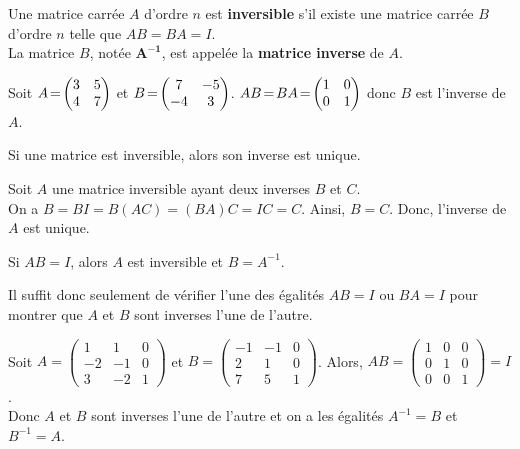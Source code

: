 \documentclass{cornouaille}
\begin{document}
\begin{definition}
Une matrice carrée $A$ d’ordre $n$ est \textbf{inversible} s’il existe une matrice carrée $B$ d’ordre $n$ telle que $AB=BA=I$.\\
La matrice $B$, notée $\boldsymbol{A^{-1}}$, est appelée la
\textbf{matrice inverse} de $A$.
\end{definition}

\begin{exemple}\setlength{\arraycolsep}{3.5pt}
Soit $A\hskip-.5mm=\hskip-.5mm\begin{pmatrix}
 3 & 5 \\
4 & 7
\end{pmatrix}$ et $B\hskip-.5mm=\hskip-.5mm\begin{pmatrix}
 7 & -5 \\
-4 & 3
\end{pmatrix}$. $AB\hskip-.5mm=\hskip-.5mmBA\hskip-.5mm=\hskip-.5mm\begin{pmatrix}
 1 & 0 \\
0 & 1
\end{pmatrix}$ donc $B$ est l'inverse de $A$.
\end{exemple}

\begin{propriete}
Si une matrice est inversible, alors son inverse est unique.
\end{propriete}

\begin{preuve}
Soit $A$ une matrice inversible ayant deux inverses  $B$ et $C$.\\
On a $B=BI=B(AC)=(BA)C=IC=C$. Ainsi, $B=C$. Donc, l'inverse de $A$ est unique.
\end{preuve}



\begin{propriete}
Si $AB=I$, alors $A$ est inversible et $B=A^{-1}$.
\end{propriete}

\begin{remarque}
Il suffit donc  seulement  de vérifier l'une des égalités $AB=I$ ou $BA=I$ pour montrer que $A$ et $B$ sont inverses l'une de l'autre.
\end{remarque}

\begin{exemple}
\renewcommand{\arraystretch}{0.9}
Soit $A=\begin{pmatrix}
1 & 1  & 0\\
-2 & -1 & 0 \\
3 & -2 & 1
\end{pmatrix}$ et
$B=\begin{pmatrix}
-1 & -1 & 0 \\
2 & 1 & 0 \\
7 & 5 & 1
\end{pmatrix}$. Alors, $AB=\begin{pmatrix}
 1 & 0 & 0\\
0 & 1 & 0 \\
0 & 0 & 1
\end{pmatrix}=I$.\\
Donc $A$ et $B$ sont inverses l'une de l'autre et on a les égalités $A^{-1}=B$ et $B^{-1}=A$.
\end{exemple}
\end{document}
